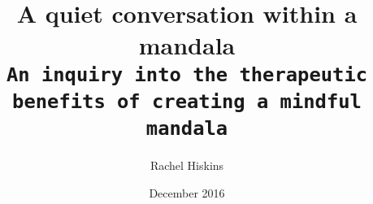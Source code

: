 \documentclass[oneside]{book}
\author{Rachel Hiskins}
\title{{\Huge A quiet conversation within a mandala}\\[15pt]
\space
\texttt{An inquiry into the therapeutic \\benefits of creating a mindful mandala}}
\date {December 2016}
\begin{document}
\begin{titlepage}
	\calligra
    \maketitle
\end{titlepage}
\doublespacing 

\tableofcontents  


	




	
	
	
	

	











\end{document}
